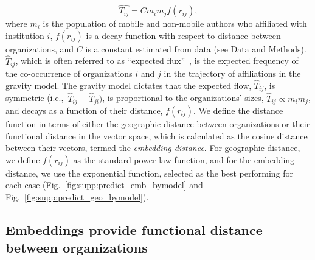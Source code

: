 \documentclass[12pt]{article} %
\def\ie{i.e.,~}
\begin{document}
\begin{equation}
	\label{eq:gravity_basic}
	\hat{T_{ij}} = Cm_{i}m_{j}f(r_{ij}),
\end{equation}
where $m_{i}$ is the population of mobile and non-mobile authors who affiliated with institution $i$, $f(r_{ij})$ is a decay function with respect to distance between organizations, and $C$ is a constant estimated from data (see Data and Methods). 
$\hat{T}_{ij}$, which is often referred to as ``expected flux''~\autocite{simini2012universal}, is the expected frequency of the co-occurrence of organizations $i$ and $j$ in the trajectory of affiliations in the gravity model.
The gravity model dictates that the expected flow, $\hat{T}_{ij}$, is symmetric (\ie $\hat{T}_{ij }= \hat{T}_{ji})$, is proportional to the organizations' sizes, $\hat{T}_{ij} \propto m_{i} m_{j}$, and decays as a function of their distance, $f(r_{ij})$. 
We define the distance function in terms of either the geographic distance between organizations or their functional distance in the vector space, which is calculated as the cosine distance between their vectors, termed the \textit{embedding distance}. For geographic distance, we define $f(r_{ij})$ as the standard power-law function, and for the embedding distance, we use the exponential function, selected as the best performing for each case (Fig.~\ref{fig:supp:predict_emb_bymodel} and Fig.~\ref{fig:supp:predict_geo_bymodel}).


%
%
%
\subsection*{Embeddings provide functional distance between organizations}
\end{document}

